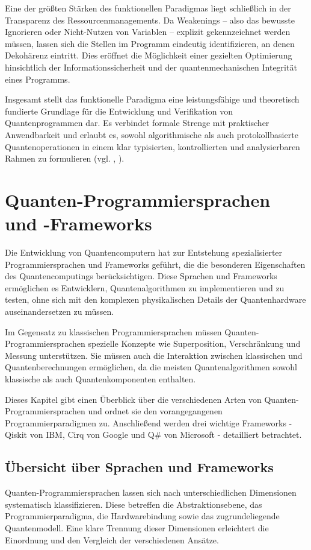 Eine der größten Stärken des funktionellen Paradigmas liegt schließlich in der Transparenz des Ressourcenmanagements. Da Weakenings -- also das bewusste Ignorieren oder Nicht-Nutzen von Variablen -- explizit gekennzeichnet werden müssen, lassen sich die Stellen im Programm eindeutig identifizieren, an denen Dekohärenz eintritt. Dies eröffnet die Möglichkeit einer gezielten Optimierung hinsichtlich der Informationssicherheit und der quantenmechanischen Integrität eines Programms.

Insgesamt stellt das funktionelle Paradigma eine leistungsfähige und theoretisch fundierte Grundlage für die Entwicklung und Verifikation von Quantenprogrammen dar. Es verbindet formale Strenge mit praktischer Anwendbarkeit und erlaubt es, sowohl algorithmische als auch protokollbasierte Quantenoperationen in einem klar typisierten, kontrollierten und analysierbaren Rahmen zu formulieren (vgl. \citeauthor{thorsten_altenkirch_functional_2005}, \citeyear{thorsten_altenkirch_functional_2005}).


\section{Quanten-Programmiersprachen und -Frameworks}
\label{sec:programming-languages}

Die Entwicklung von Quantencomputern hat zur Entstehung spezialisierter Programmiersprachen und Frameworks geführt, die die besonderen Eigenschaften des Quantencomputings berücksichtigen. Diese Sprachen und Frameworks ermöglichen es Entwicklern, Quantenalgorithmen zu implementieren und zu testen, ohne sich mit den komplexen physikalischen Details der Quantenhardware auseinandersetzen zu müssen.

Im Gegensatz zu klassischen Programmiersprachen müssen Quanten-Programmiersprachen spezielle Konzepte wie Superposition, Verschränkung und Messung unterstützen. Sie müssen auch die Interaktion zwischen klassischen und Quantenberechnungen ermöglichen, da die meisten Quantenalgorithmen sowohl klassische als auch Quantenkomponenten enthalten.

Dieses Kapitel gibt einen Überblick über die verschiedenen Arten von Quanten-Programmiersprachen und ordnet sie den vorangegangenen Programmierparadigmen zu. Anschließend werden drei wichtige Frameworks - Qiskit von IBM, Cirq von Google und Q\# von Microsoft - detailliert betrachtet.

\subsection{Übersicht über Sprachen und Frameworks}
Quanten-Programmiersprachen lassen sich nach unterschiedlichen Dimensionen systematisch klassifizieren. Diese betreffen die Abstraktionsebene, das Programmierparadigma, die Hardwarebindung sowie das zugrundeliegende Quantenmodell. Eine klare Trennung dieser Dimensionen erleichtert die Einordnung und den Vergleich der verschiedenen Ansätze. 


